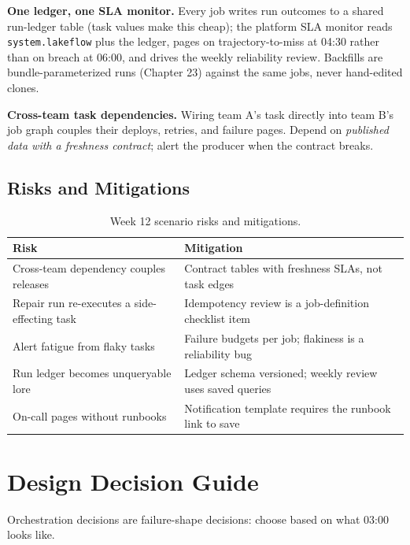 \textbf{One ledger, one SLA monitor.} Every job writes run outcomes to a shared run-ledger table (task values make this cheap); the platform SLA monitor reads \texttt{system.lakeflow} plus the ledger, pages on trajectory-to-miss at 04:30 rather than on breach at 06:00, and drives the weekly reliability review. Backfills are bundle-parameterized runs (Chapter 23) against the same jobs, never hand-edited clones.

\begin{pitfall}
\textbf{Cross-team task dependencies.} Wiring team A's task directly into team B's job graph couples their deploys, retries, and failure pages. Depend on \emph{published data with a freshness contract}; alert the producer when the contract breaks.
\end{pitfall}

\subsection{Risks and Mitigations}
\begin{table}[H]
\centering
\small
\begin{tabular}{@{}p{4.6cm}p{7.6cm}@{}}
\toprule
\textbf{Risk} & \textbf{Mitigation} \\
\midrule
Cross-team dependency couples releases & Contract tables with freshness SLAs, not task edges \\
Repair run re-executes a side-effecting task & Idempotency review is a job-definition checklist item \\
Alert fatigue from flaky tasks & Failure budgets per job; flakiness is a reliability bug \\
Run ledger becomes unqueryable lore & Ledger schema versioned; weekly review uses saved queries \\
On-call pages without runbooks & Notification template requires the runbook link to save \\
\bottomrule
\end{tabular}
\caption{Week 12 scenario risks and mitigations.}
\label{tab:ch12-risks}
\end{table}

\section{Design Decision Guide}
%
Orchestration decisions are failure-shape decisions: choose based on what 03:00 looks like.

